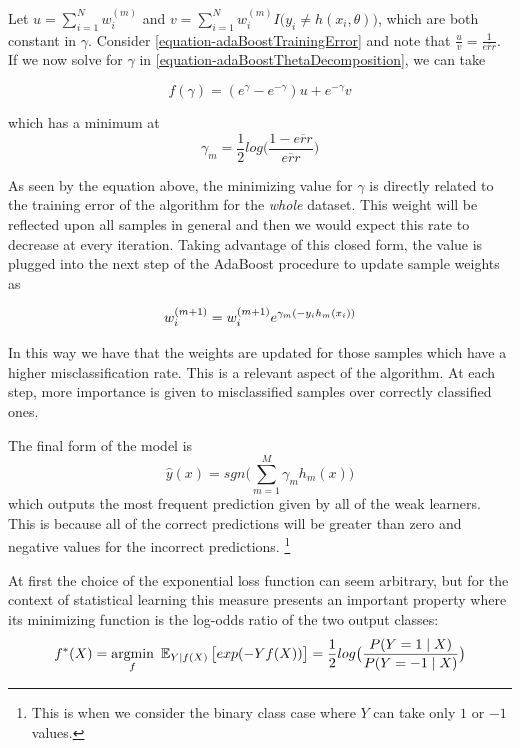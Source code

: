 Let $u = \sum_{i=1}^{N}  w_i^{(m)}$ and $v = \sum_{i=1}^{N}  w_i^{(m)} I \big( y_i \neq h(x_i,\theta)   \big) $, which are both constant in $\gamma$. Consider \ref{equation-adaBoostTrainingError} and note that $\frac{u}{v} = \frac{1}{\overline{err}}$. If we now solve for $\gamma$ in \ref{equation-adaBoostThetaDecomposition}, we can take

\begin{equation} \label{equation-adaBoostBetaMinimization}
f(\gamma) = ( e^{\gamma} - e^{-\gamma}) u +  e^{-\gamma}v
\end{equation}

which has a minimum at
\begin{equation}
\gamma_{m} = \frac{1}{2} log\big( \frac{1 - \overline{err} }{ \overline{err} }  \big)
\end{equation}

As seen by the equation above, the minimizing value for $\gamma$ is directly related to the training error of the algorithm for the \textit{whole} dataset. This weight will be reflected upon all samples in general and then we would expect this rate to decrease at every iteration.  Taking advantage of this closed form, the value is plugged into the next step of the AdaBoost procedure to update sample weights as

\begin{equation}
w_i^{(m+1)} =   w_i^{(m+1)} e^{\gamma_m(-y_i h_m(x_i))} \\
\end{equation}

In this way we have that the weights are updated for those samples which have a higher misclassification rate. This is a relevant aspect of the algorithm. At each step, more importance is given to misclassified samples over correctly classified ones.



The final form of the model is
$$  \hat{y}(x) = sgn\big(  \sum_{m=1}^{M} \gamma_m h_m(x) \big)$$ which outputs the most frequent prediction given by all of the weak learners. This is because all of the correct predictions will be greater than zero and negative values for the incorrect predictions. \footnote{This is when we consider the binary class case where $Y$ can take only $1$ or $-1$ values.}

At first the choice of the exponential loss function can seem arbitrary, but for the context of statistical learning this measure presents an important property where its minimizing function is the log-odds ratio of the two output classes:
$$f^*(X) = \underset{f}{\mathrm{argmin}} \  \operatorname{\mathbb{E}}_{Y | f(X)}\big[ exp(-Yf(X))  \big] = \frac{1}{2}
log\big( \frac{ P(Y=1 \mid X) }{ P(Y=-1 \mid X) }  \big) $$


